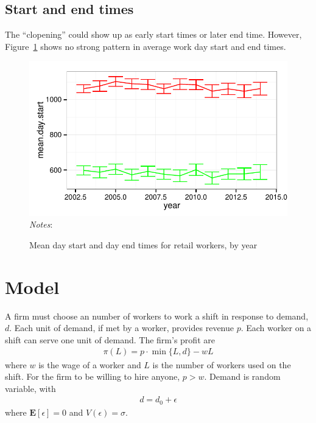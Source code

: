 \documentclass[11pt]{article}
\begin{document}
\subsection{Start and end times}

The ``clopening'' could show up as early start times or later end time.
However, Figure~\ref{fig:clopening} shows no strong pattern in average work day start and end times.

\begin{figure}[h]
\centering 
\caption{Mean day start and day end times for retail workers, by year} \label{fig:clopening}
\begin{minipage}{0.90 \linewidth}
\includegraphics[width = \linewidth]{./plots/clopening.pdf}
\\
\emph{Notes}: 
\end{minipage} 
\end{figure}

\section{Model}
A firm must choose an number of workers to work a shift in response to demand, $d$. 
Each unit of demand, if met by a worker, provides revenue $p$.
Each worker on a shift can serve one unit of demand. 
The firm's profit are 
\begin{align}
 \pi(L) = p \cdot \min \{L, d\} - w L   
\end{align} 
where $w$ is the wage of a worker and $L$ is the number of workers used on the shift. 
For the firm to be willing to hire anyone, $p > w$. 
Demand is random variable, with 
\begin{align}
 d = d_0 + \epsilon   
\end{align}
where $\mathbf{E}[\epsilon] = 0$ and $V(\epsilon) = \sigma$.
\end{document}
